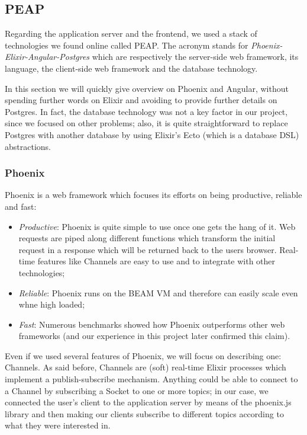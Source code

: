 \subsection{PEAP}
Regarding the application server and the frontend, we used a stack of
technologies we found online called PEAP. The acronym stands for
\textit{Phoenix-Elixir-Angular-Postgres} which are respectively the
server-side web framework, its language, the client-side web framework and the
database technology.

In this section we will quickly give overview on Phoenix and Angular, without
spending further words on Elixir and avoiding to provide further details on
Postgres. In fact, the database technology was not a key factor in our project,
since we focused on other problems; also, it is quite straightforward to
replace Postgres with another database by using Elixir's Ecto (which is a
database DSL) abstractions.

\subsubsection{Phoenix}

Phoenix is a web framework which focuses its efforts on being productive,
reliable and fast:

\begin{itemize}
  \item \textit{Productive}: Phoenix is quite simple to use once one gets the
    hang of it. Web requests are piped along different functions which
    transform the initial request in a response which will be returned back to
    the users browser. Real-time features like Channels are easy to use and to
    integrate with other technologies;
  \item \textit{Reliable}: Phoenix runs on the BEAM VM and therefore can easily
    scale even whne high loaded;
  \item \textit{Fast}: Numerous benchmarks showed how Phoenix outperforms other
    web frameworks (and our experience in this project later confirmed this
    claim).
\end{itemize}

Even if we used several features of Phoenix, we will focus on describing one:
Channels. As said before, Channels are (soft) real-time Elixir processes which
implement a publish-subscribe mechanism.
Anything could be able to connect to a Channel by subscribing a Socket to one
or more topics; in our case, we connected the user's client to the application
server by means of the phoenix.js library and then making our clients subscribe
to different topics according to what they were interested in.

